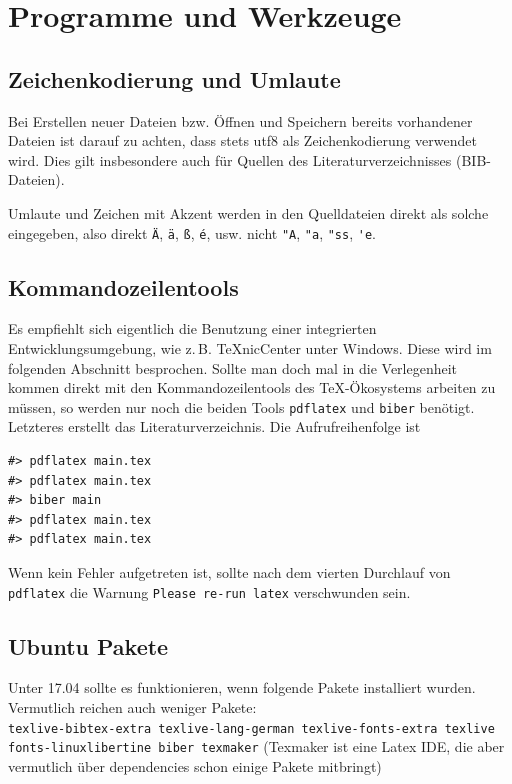 \chapter{Programme und Werkzeuge}

\section{Zeichenkodierung und Umlaute}

Bei Erstellen neuer Dateien bzw. Öffnen und Speichern bereits vorhandener
Dateien ist darauf zu achten, dass stets \gls{utf8} als
Zeichenkodierung verwendet wird. Dies gilt insbesondere
auch für Quellen des Literaturverzeichnisses (BIB-Dateien).

Umlaute und Zeichen mit Akzent werden in den Quelldateien direkt
als solche eingegeben, also direkt \verb#Ä#, \verb#ä#, \verb#ß#, \verb#é#, usw. nicht
\verb#"A#, \verb#"a#, \verb#"ss#, \verb#'e#.

\section{Kommandozeilentools}

Es empfiehlt sich eigentlich die Benutzung einer integrierten
Entwicklungsumgebung, wie z.\,B. TeXnicCenter unter Windows. Diese wird im
folgenden Abschnitt besprochen. Sollte man doch mal in die Verlegenheit kommen
direkt mit den Kommandozeilentools des TeX-Ökosystems arbeiten zu müssen, so
werden nur noch die beiden Tools \texttt{pdflatex} und \texttt{biber} benötigt.
Letzteres erstellt das Literaturverzeichnis. Die Aufrufreihenfolge ist
\begin{verbatim}
#> pdflatex main.tex
#> pdflatex main.tex
#> biber main
#> pdflatex main.tex
#> pdflatex main.tex
\end{verbatim}
Wenn kein Fehler aufgetreten ist, sollte nach dem vierten Durchlauf
von \texttt{pdflatex} die Warnung
\texttt{Please re-run latex} verschwunden sein.

\section{Ubuntu Pakete}
Unter 17.04 sollte es funktionieren, wenn folgende Pakete installiert wurden. Vermutlich reichen auch weniger Pakete:\\
{\small\verb#texlive-bibtex-extra texlive-lang-german texlive-fonts-extra texlive#}\\
{\small\verb#fonts-linuxlibertine biber texmaker#}
(Texmaker ist eine Latex IDE, die aber vermutlich über dependencies schon einige Pakete mitbringt)


